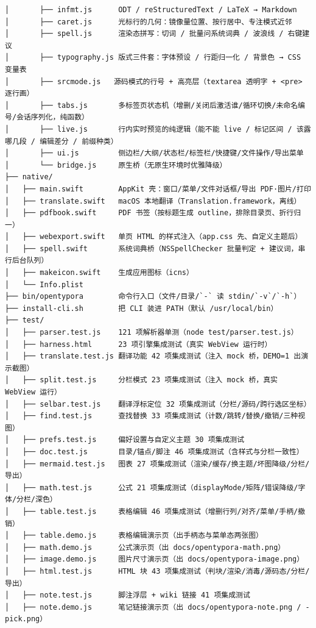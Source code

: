 \documentclass[11pt,a4paper]{ctexart}
\begin{document}
\begin{verbatim}
│       ├── infmt.js      ODT / reStructuredText / LaTeX → Markdown
│       ├── caret.js      光标行的几何：镜像量位置、按行居中、专注模式近邻
│       ├── spell.js      渲染态拼写：切词 / 批量问系统词典 / 波浪线 / 右键建议
│       ├── typography.js 版式三件套：字体预设 / 行距归一化 / 背景色 → CSS 变量表
│       ├── srcmode.js   源码模式的行号 + 高亮层（textarea 透明字 + <pre> 逐行画）
│       ├── tabs.js       多标签页状态机（增删/关闭后激活谁/循环切换/未命名编号/会话序列化，纯函数）
│       ├── live.js       行内实时预览的纯逻辑（能不能 live / 标记区间 / 该露哪几段 / 编辑差分 / 前缀种类）
│       ├── ui.js         侧边栏/大纲/状态栏/标签栏/快捷键/文件操作/导出菜单
│       └── bridge.js     原生桥（无原生环境时优雅降级）
├── native/
│   ├── main.swift        AppKit 壳：窗口/菜单/文件对话框/导出 PDF·图片/打印
│   ├── translate.swift   macOS 本地翻译（Translation.framework，离线）
│   ├── pdfbook.swift     PDF 书签（按标题生成 outline，排除目录页、折行归一）
│   ├── webexport.swift   单页 HTML 的样式注入（app.css 先、自定义主题后）
│   ├── spell.swift       系统词典桥（NSSpellChecker 批量判定 + 建议词，串行后台队列）
│   ├── makeicon.swift    生成应用图标（icns）
│   └── Info.plist
├── bin/opentypora        命令行入口（文件/目录/`-` 读 stdin/`-v`/`-h`）
├── install-cli.sh        把 CLI 装进 PATH（默认 /usr/local/bin）
├── test/
│   ├── parser.test.js    121 项解析器单测（node test/parser.test.js）
│   ├── harness.html      23 项引擎集成测试（真实 WebView 运行时）
│   ├── translate.test.js 翻译功能 42 项集成测试（注入 mock 桥，DEMO=1 出演示截图）
│   ├── split.test.js     分栏模式 23 项集成测试（注入 mock 桥，真实 WebView 运行）
│   ├── selbar.test.js    翻译浮标定位 32 项集成测试（分栏/源码/跨行选区坐标）
│   ├── find.test.js      查找替换 33 项集成测试（计数/跳转/替换/撤销/三种视图）
│   ├── prefs.test.js     偏好设置与自定义主题 30 项集成测试
│   ├── doc.test.js       目录/锚点/脚注 46 项集成测试（含样式与分栏一致性）
│   ├── mermaid.test.js   图表 27 项集成测试（渲染/缓存/换主题/坏图降级/分栏/导出）
│   ├── math.test.js      公式 21 项集成测试（displayMode/矩阵/错误降级/字体/分栏/深色）
│   ├── table.test.js     表格编辑 46 项集成测试（增删行列/对齐/菜单/手柄/撤销）
│   ├── table.demo.js     表格编辑演示页（出手柄态与菜单态两张图）
│   ├── math.demo.js      公式演示页（出 docs/opentypora-math.png）
│   ├── image.demo.js     图片尺寸演示页（出 docs/opentypora-image.png）
│   ├── html.test.js      HTML 块 43 项集成测试（判块/渲染/消毒/源码态/分栏/导出）
│   ├── note.test.js      脚注浮层 + wiki 链接 41 项集成测试
│   ├── note.demo.js      笔记链接演示页（出 docs/opentypora-note.png / -pick.png）

\end{verbatim}
\end{document}
